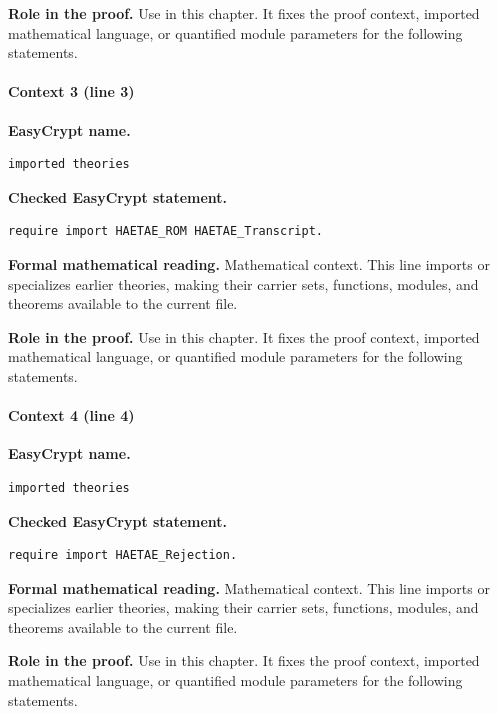 \noindent\textbf{Role in the proof.}
Use in this chapter. It fixes the proof context, imported mathematical language, or quantified module parameters for the following statements.

\paragraph{Context 3 (line 3)}
\noindent\textbf{EasyCrypt name.}
\begin{lstlisting}[language=EasyCrypt,basicstyle=\ttfamily\scriptsize]
imported theories
\end{lstlisting}
\noindent\textbf{Checked EasyCrypt statement.}
\begin{lstlisting}[language=EasyCrypt,basicstyle=\ttfamily\scriptsize]
require import HAETAE_ROM HAETAE_Transcript.
\end{lstlisting}
\noindent\textbf{Formal mathematical reading.}
Mathematical context. This line imports or specializes earlier theories, making their carrier sets, functions, modules, and theorems available to the current file.

\noindent\textbf{Role in the proof.}
Use in this chapter. It fixes the proof context, imported mathematical language, or quantified module parameters for the following statements.

\paragraph{Context 4 (line 4)}
\noindent\textbf{EasyCrypt name.}
\begin{lstlisting}[language=EasyCrypt,basicstyle=\ttfamily\scriptsize]
imported theories
\end{lstlisting}
\noindent\textbf{Checked EasyCrypt statement.}
\begin{lstlisting}[language=EasyCrypt,basicstyle=\ttfamily\scriptsize]
require import HAETAE_Rejection.
\end{lstlisting}
\noindent\textbf{Formal mathematical reading.}
Mathematical context. This line imports or specializes earlier theories, making their carrier sets, functions, modules, and theorems available to the current file.

\noindent\textbf{Role in the proof.}
Use in this chapter. It fixes the proof context, imported mathematical language, or quantified module parameters for the following statements.

